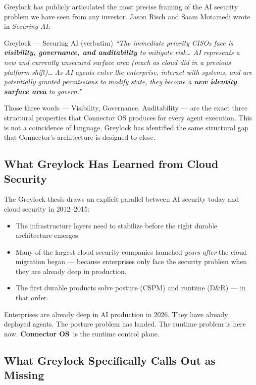 \documentclass[11pt,a4paper]{article}
\newcommand{\connector}{\textbf{Connector OS}}
\begin{document}
Greylock has publicly articulated the most precise framing of the AI security problem we have seen from any investor. Jason Risch and Saam Motamedi wrote in \emph{Securing AI}:

\begin{greybox}{Greylock — Securing AI (verbatim)}
\emph{``The immediate priority CISOs face is \textbf{visibility, governance, and auditability} to mitigate risk\ldots
AI represents a new and currently unsecured surface area (much as cloud did in a previous platform shift)\ldots
As AI agents enter the enterprise, interact with systems, and are potentially granted permissions to modify state,
they become a \textbf{new identity surface area} to govern.''}
\end{greybox}

Those three words — Visibility, Governance, Auditability — are the exact three structural properties that Connector OS
produces for every agent execution. This is not a coincidence of language. Greylock has identified the same structural gap that Connector's architecture is designed to close.

\subsection{What Greylock Has Learned from Cloud Security}

The Greylock thesis draws an explicit parallel between AI security today and cloud security in 2012--2015:

\begin{itemize}
  \item The infrastructure layers need to stabilize before the right durable architecture emerges.
  \item Many of the largest cloud security companies launched \emph{years after} the cloud migration began — because enterprises only face the security problem when they are already deep in production.
  \item The first durable products solve posture (CSPM) and runtime (D\&R) — in that order.
\end{itemize}

Enterprises are already deep in AI production in 2026. They have already deployed agents. The posture problem has landed. The runtime problem is here now. \connector\ is the runtime control plane.

\subsection{What Greylock Specifically Calls Out as Missing}
\end{document}
